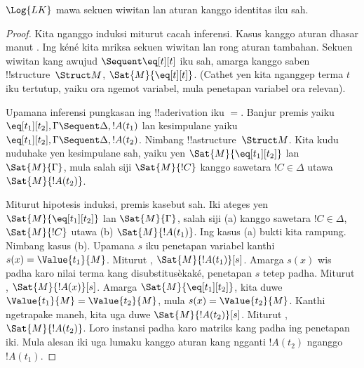 \documentclass[../../../include/open-logic-section]{subfiles}
\begin{document}


\begin{prop}
$\Log{LK}$ mawa sekuen wiwitan lan aturan kanggo identitas iku sah.
\end{prop}

\begin{proof}
Kita nganggo induksi miturut cacah inferensi. Kasus kanggo aturan dhasar
manut . Ing kéné kita
mriksa sekuen wiwitan lan rong aturan tambahan.
Sekuen wiwitan kang awujud ${} \Sequent \eq[t][t]$ iku sah, amarga
kanggo saben !!{structure}~$\Struct M$, $\Sat{M}{\eq[t][t]}$. (Cathet
yen kita nganggep terma $t$ iku tertutup, yaiku ora ngemot variabel,
mula penetapan variabel ora relevan).

Upamana inferensi pungkasan ing !!a{derivation} iku $=$. Banjur premis
yaiku $\eq[t_1][t_2], \Gamma \Sequent \Delta, !A(t_1)$ lan
kesimpulane yaiku $\eq[t_1][t_2], \Gamma \Sequent \Delta, !A(t_2)$.
Nimbang !!a{structure}~$\Struct M$. Kita kudu nuduhake yen kesimpulane
sah, yaiku yen $\Sat{M}{\eq[t_1][t_2]}$ lan $\Sat{M}{\Gamma}$, mula
salah siji $\Sat{M}{!C}$ kanggo sawetara $!C \in \Delta$ utawa
$\Sat{M}{!A(t_2)}$.

Miturut hipotesis induksi, premis kasebut sah. Iki ateges yen
$\Sat{M}{\eq[t_1][t_2]}$ lan $\Sat{M}{\Gamma}$, salah siji (a) kanggo
sawetara $!C \in \Delta$, $\Sat{M}{!C}$ utawa (b)
$\Sat{M}{!A(t_1)}$. Ing kasus (a) bukti kita rampung. Nimbang kasus
(b). Upamana $s$ iku penetapan variabel kanthi $s(x) =
\Value{t_1}{M}$. Miturut
,
$\Sat{M}{!A(t_1)}[s]$. Amarga $s(x)$ wis padha karo nilai terma
kang disubstitusèkaké, penetapan $s$ tetep padha. Miturut
, $\Sat{M}{!A(x)}[s]$. Amarga
$\Sat{M}{\eq[t_1][t_2]}$, kita duwe $\Value{t_1}{M} =
\Value{t_2}{M}$, mula $s(x) = \Value{t_2}{M}$. Kanthi ngetrapake
 maneh, kita uga duwe
$\Sat{M}{!A(t_2)}[s]$. Miturut
,
$\Sat{M}{!A(t_2)}$. Loro instansi padha karo matriks kang padha ing penetapan iki.
Mula alesan iki uga lumaku kanggo aturan kang ngganti $!A(t_2)$
nganggo $!A(t_1)$.
\end{proof}
\end{document}
